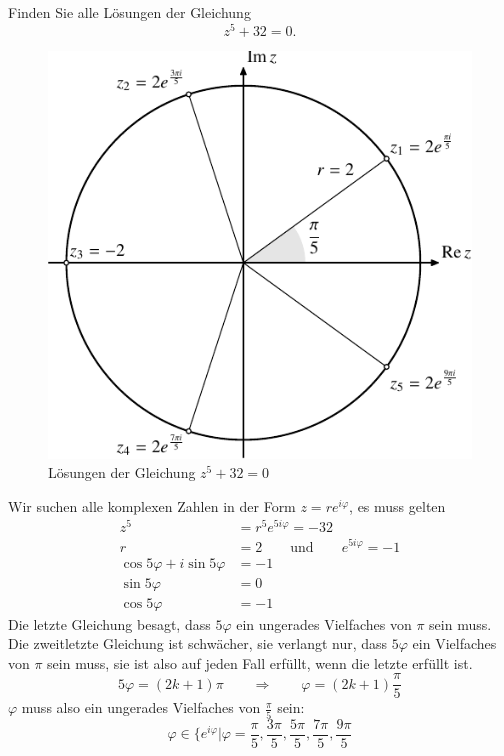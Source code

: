 Finden Sie alle Lösungen der Gleichung
\[
z^5+32=0.
\]

\begin{loesung}
\begin{figure}
\centering
\includegraphics{chapters/uebungsaufgaben/exercise-1.pdf}
\caption{Lösungen der Gleichung $z^5+32=0$
\label{skript:15006:loesungen}}
\end{figure}
Wir suchen alle komplexen Zahlen in der Form $z=re^{i\varphi}$, es muss gelten
\begin{align*}
z^5&=r^5e^{5i\varphi}=-32
\\
r&=2\qquad\text{und}\qquad e^{5i\varphi}=-1
\\
\cos 5\varphi+i\sin 5\varphi&=-1
\\
\sin 5\varphi&=0
\\
\cos 5\varphi&=-1
\end{align*}
Die letzte Gleichung besagt, dass $5\varphi$ ein ungerades Vielfaches von
$\pi$ sein muss. Die zweitletzte Gleichung ist schwächer, sie verlangt
nur, dass $5\varphi$ ein Vielfaches von $\pi$ sein muss, sie ist also
auf jeden Fall erfüllt, wenn die letzte erfüllt ist.
\[
5\varphi=(2k+1)\pi
\qquad\Rightarrow\qquad
\varphi=(2k+1)\frac{\pi}5
\]
$\varphi$ muss also ein ungerades Vielfaches von $\frac{\pi}5$ sein:
\[
\varphi\in\biggl\{
e^{i\varphi}\bigg|
\varphi
=
\frac{\pi}{5},
\frac{3\pi}{5},
\frac{5\pi}{5},
\frac{7\pi}{5},
\frac{9\pi}{5}
\]
\end{loesung}
